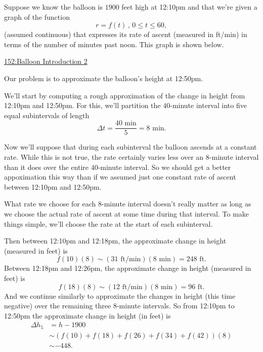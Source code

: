 \documentclass{ximera}
\begin{document}
\begin{example}  \label{Ex:98dfrghha}
Suppose we know the balloon is $1900$ feet high at 12:10pm and that we're given a graph of the function
\[
    r = f(t) \, , \, 0\leq t \leq  60 , 
\]
(assumed continuous) that expresses its rate of ascent (measured in ft/min) in terms of the number of minutes past noon. This graph is shown below.

\begin{onlineOnly}
    \begin{center}
\end{center}
\end{onlineOnly}

\href{https://www.desmos.com/calculator/h6cworakdw}{152:Balloon Introduction 2}

Our problem is to approximate the balloon's height at 12:50pm.

We'll start by computing a rough approximation of the change in height from 12:10pm and 12:50pm. For this, we'll partition the $40$-minute interval into five equal subintervals of length 
\[
  \Delta t = \frac{40\text{ min}}{5} = 8 \text{ min}.
\]
 
Now we'll suppose that during each subinterval the balloon ascends at a constant rate. While this is not true, the rate certainly varies less over an $8$-minute interval than it does over the entire $40$-minute interval. So we should get a better appoximation  this way than if we assumed just one constant rate of ascent between 12:10pm and 12:50pm.

What rate we choose for each $8$-minute interval doesn't really matter as long as we choose the actual rate of ascent at some time during that interval. To make things simple, we'll choose the rate at the start of each subinterval. 

Then between 12:10pm and 12:18pm, the approximate change in height (measured in feet) is %
\[
        f(10)(8) \sim (31 \text{ ft/min})(8 \text{ min}) = 248 \text{ ft}. 
\]
Between 12:18pm and 12:26pm, the approximate change in height (measured in feet) is
\[
        f(18)(8) \sim (12 \text{ ft/min})(8 \text{ min}) = 96 \text{ ft}. 
\]
And we continue similarly to approximate the changes in height (this time negative) over the remaining three 8-minute intervals. So from 12:10pm to 12:50pm the approximate change in height (in feet) is
\begin{align*}
  \Delta h_5 &= h - 1900  \\
               &\sim (f(10) + f(18) + f(26)+ f(34) + f(42))(8) \\
               &\sim -448 .
\end{align*}


\end{example}
\end{document}

